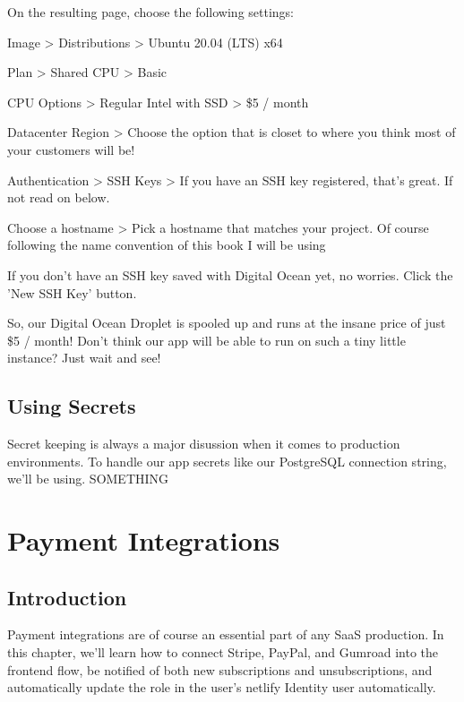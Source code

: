 \documentclass[a4paper,
                             oneside,
                             BCOR1.0cm,
                             DIV11,
                             parskip=full,
                             11pt]{scrbook}
\begin{document}
On the resulting page, choose the following settings:

\begin{arrows}
\item Image > Distributions > Ubuntu 20.04 (LTS) x64
\item Plan > Shared CPU > Basic
\item CPU Options > Regular Intel with SSD > \$5 / month
\item Datacenter Region > Choose the option that is closet to where you think most of your customers will be!
\item Authentication > SSH Keys > If you have an SSH key registered, that's great. If not read on below.
\item Choose a hostname > Pick a hostname that matches your project. Of course following the name convention of this book I will be using 
\end{arrows}


If you don't have an SSH key saved with Digital Ocean yet, no worries. Click the 'New SSH Key' button.

So, our Digital Ocean Droplet is spooled up and runs at the insane price of just \$5 / month! Don't think our app will be able to run on such a tiny little instance? Just wait and see!

\section{Using Secrets}

Secret keeping is always a major disussion when it comes to production environments. To handle our app secrets like our PostgreSQL connection string, we'll be using. SOMETHING


\chapter{Payment Integrations}\label{cap:primer}

\section{Introduction}

Payment integrations are of course an essential part of any SaaS production. In this chapter, we'll learn how to connect Stripe, PayPal, and Gumroad into the frontend flow, be notified of both new subscriptions and unsubscriptions, and automatically update the role in the user's netlify Identity user automatically.
\end{document}
